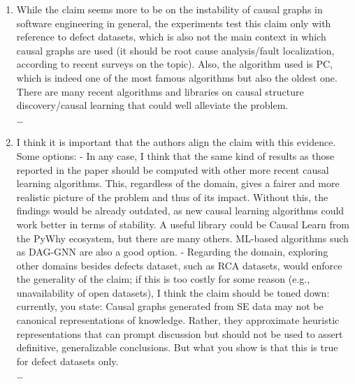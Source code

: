 \documentclass[]{svjour3}
\begin{document}
\begin{enumerate}
\begin{enumerate}
        \item While the claim seems more to be on the instability of causal graphs in software engineering in general, the experiments test this claim only with reference to defect datasets, which is also not the main context in which causal graphs are used (it should be root cause analysis/fault localization, according to recent surveys on the topic). Also, the algorithm used is PC, which is indeed one of the most famous algorithms but also the oldest one. There are many recent algorithms and libraries on causal structure discovery/causal learning that could well alleviate the problem.\\{\MARK \dots}
        \item I think it is important that the authors align the claim with this evidence. Some options:
- In any case, I think that the same kind of results as those reported in the paper should be computed with other more recent causal learning algorithms. This, regardless of the domain, gives a fairer and more realistic picture of the problem and thus of its impact. Without this, the findings would be already outdated, as new causal learning algorithms could work better in terms of stability. A useful library could be Causal Learn from the PyWhy ecosystem, but there are many others. ML-based algorithms such as DAG-GNN are also a good option.   
- Regarding the domain, exploring other domains besides defects dataset, such as RCA datasets, would enforce the generality of the claim; if this is too costly for some reason (e.g., unavailability of open datasets), I think the claim should be toned down: currently, you state:
Causal graphs generated from SE data may not be canonical representations of knowledge. Rather, they approximate heuristic representations that can prompt discussion but should not be used to assert definitive, generalizable conclusions.
But what you show is that this is true for defect datasets only.\\{\MARK \dots}


\end{enumerate}
\end{enumerate}
\end{document}
